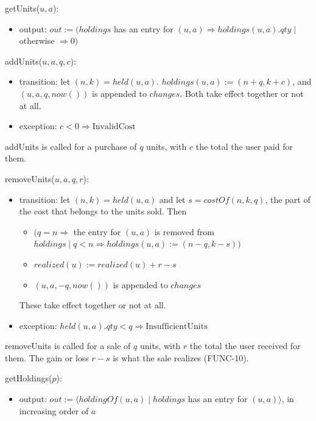 \documentclass[12pt, titlepage]{article}
\begin{document}
\noindent getUnits($u, a$):
\begin{itemize}
\item output: $\mathit{out} := (\mathit{holdings}$ has an entry for $(u, a)
  \Rightarrow \mathit{holdings}(u, a).\mathit{qty} \mid$ otherwise
  $\Rightarrow 0)$
\end{itemize}

\noindent addUnits($u, a, q, c$):
\begin{itemize}
\item transition: let $(n, k) = \mathit{held}(u, a)$. $\mathit{holdings}(u,
  a) := (n + q, k + c)$, and $(u, a, q, \mathit{now}())$ is appended to
  $\mathit{changes}$. Both take effect together or not at all.
\item exception: $c < 0 \Rightarrow \mathrm{InvalidCost}$
\end{itemize}

\noindent addUnits is called for a purchase of $q$ units, with $c$ the total
the user paid for them.

\medskip

\noindent removeUnits($u, a, q, r$):
\begin{itemize}
\item transition: let $(n, k) = \mathit{held}(u, a)$ and let $s =
  \mathit{costOf}(n, k, q)$, the part of the cost that belongs to the units
  sold. Then
  \begin{itemize}
  \item $(q = n \Rightarrow$ the entry for $(u, a)$ is removed from
    $\mathit{holdings} \mid q < n \Rightarrow \mathit{holdings}(u, a) := (n -
    q, k - s))$
  \item $\mathit{realized}(u) := \mathit{realized}(u) + r - s$
  \item $(u, a, -q, \mathit{now}())$ is appended to $\mathit{changes}$
  \end{itemize}
  These take effect together or not at all.
\item exception: $\mathit{held}(u, a).\mathit{qty} < q \Rightarrow
  \mathrm{InsufficientUnits}$
\end{itemize}

\noindent removeUnits is called for a sale of $q$ units, with $r$ the total
the user received for them. The gain or loss $r - s$ is what the sale
realizes (FUNC-10).

\medskip

\noindent getHoldings($p$):
\begin{itemize}
\item output: $\mathit{out} := \langle \mathit{holdingOf}(u, a) \mid
  \mathit{holdings}$ has an entry for $(u, a) \rangle$, in increasing order
  of $a$
\end{itemize}
\end{document}
